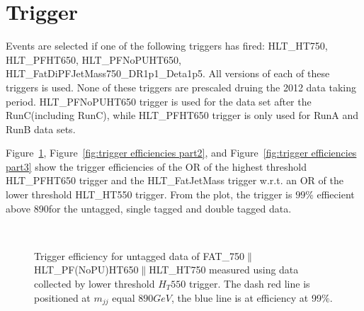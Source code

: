 \newpage

\section{Trigger}
\label{sec:trigger1}


Events are selected if one of the following triggers has fired: HLT\_HT750, HLT\_PFHT650, HLT\_PFNoPUHT650, 
HLT\_FatDiPFJetMass750\_DR1p1\_Deta1p5.  All versions of each of these triggers is used. None of these triggers are prescaled druing the 2012 data taking period. HLT\_PFNoPUHT650 trigger is used for the data set after the RunC(including RunC), while HLT\_PFHT650
trigger is only used for RunA and RunB data sets.

Figure~\ref{fig:trigger efficiencies part1}, Figure~\ref{fig:trigger efficiencies part2}, and Figure~\ref{fig:trigger efficiencies part3} show the trigger efficiencies of the OR of the highest threshold HLT\_PFHT650 trigger and the HLT\_FatJetMass trigger w.r.t. an OR of the lower threshold HLT\_HT550 trigger. From the plot, the trigger is $99\%$ effiecient above 890\GeVcc for the untagged, single tagged and double tagged data. 


\begin{figure}[htb]
\centering
      \\   
\caption[Trigger efficiencies]{Trigger efficiency for untagged data of FAT\_750$\parallel$HLT\_PF(NoPU)HT650$\parallel$HLT\_HT750 measured using data collected by lower threshold $H_T550$ trigger. The dash red line is positioned at $m_{jj}$ equal $890 GeV$, the blue line is at efficiency at 99$\%$. }
  \label{fig:trigger efficiencies part1}
\end{figure}

